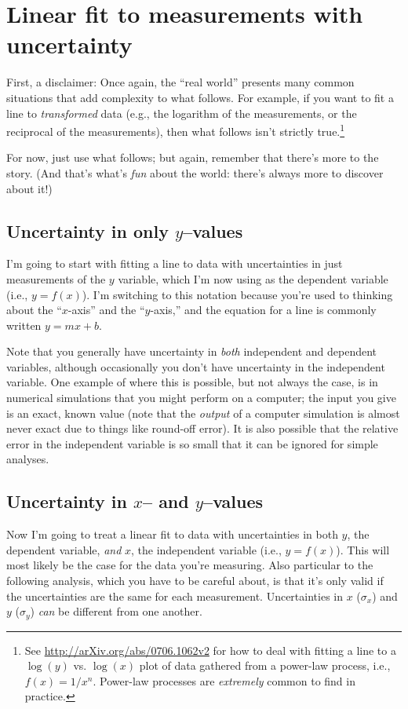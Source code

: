 \documentclass[10pt,letterpaper,twoside]{article}
\begin{document}
\section{Linear fit to measurements with uncertainty}
First, a disclaimer: Once again, the ``real world'' presents many common situations that add complexity to what follows.
For example, if you want to fit a line to \textit{transformed} data (e.g., the logarithm of the measurements, or the reciprocal of the measurements), then what follows isn't strictly true.\footnote{
See \url{http://arXiv.org/abs/0706.1062v2} for how to deal with fitting a line to a $\log(y)$ vs. $\log(x)$ plot of data gathered from a power-law process, i.e., $f(x)=1/x^n$.
Power-law processes are \textit{extremely} common to find in practice.
}

For now, just use what follows; but again, remember that there's more to the story.
(And that's what's \textit{fun} about the world: there's always more to discover about it!)

\subsection{Uncertainty in only $y$--values}
I'm going to start with fitting a line to data with uncertainties in just measurements of the $y$ variable, which I'm now using as the dependent variable (i.e., $y=f(x)$).
I'm switching to this notation because you're used to thinking about the ``$x$-axis'' and the ``$y$-axis,'' and the equation for a line is commonly written $y=mx+b$.

Note that you generally have uncertainty in \textit{both} independent and dependent variables, although occasionally you don't have uncertainty in the independent variable.
One example of where this is possible, but not always the case, is in numerical simulations that you might perform on a computer; the input you give is an exact, known value (note that the \textit{output} of a computer simulation is almost never exact due to things like round-off error).
It is also possible that the relative error in the independent variable is so small that it can be ignored for simple analyses.


\subsection{Uncertainty in $x$-- and $y$--values}
Now I'm going to treat a linear fit to data with uncertainties in both $y$, the dependent variable, \textit{and} $x$, the independent variable (i.e., $y=f(x)$).
This will most likely be the case for the data you're measuring.
Also particular to the following analysis, which you have to be careful about, is that it's only valid if the uncertainties are the same for each measurement.
Uncertainties in $x$ ($\sigma_x$) and $y$ ($\sigma_y$) \textit{can} be different from one another.
\end{document}
